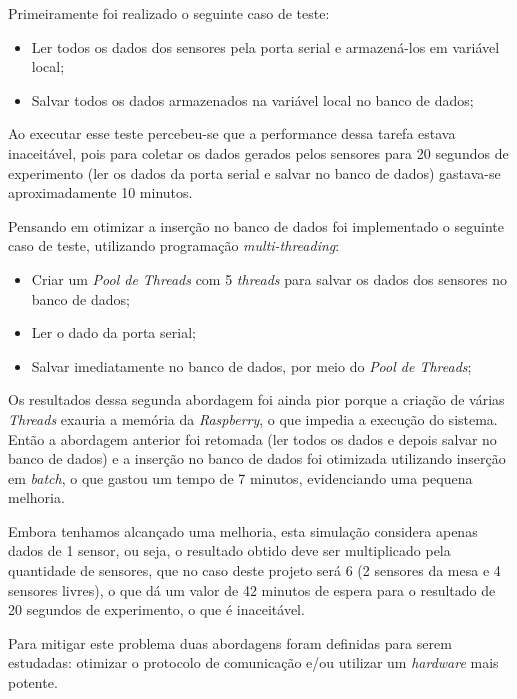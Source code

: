 Primeiramente foi realizado o seguinte caso de teste: 
\begin{itemize}
 \item Ler todos os dados dos sensores pela porta serial e armazená-los em variável local;
 \item Salvar todos os dados armazenados na variável local no banco de dados;
\end{itemize}

Ao executar esse teste percebeu-se que a performance dessa tarefa estava inaceitável, pois para coletar os dados gerados pelos sensores
para 20 segundos de experimento (ler os dados da porta serial e salvar no banco de dados) gastava-se aproximadamente 10 minutos. 

Pensando em otimizar a inserção no banco de dados foi implementado o seguinte caso de teste, utilizando programação \textit{multi-threading}:
\begin{itemize}
 \item Criar um \textit{Pool de Threads} com 5 \textit{threads} para salvar os dados dos sensores no banco de dados;
 \item Ler o dado da porta serial;
 \item Salvar imediatamente no banco de dados, por meio do \textit{Pool de Threads};
\end{itemize}

Os resultados dessa segunda abordagem foi ainda pior porque a criação de várias \textit{Threads} exauria a memória da \textit{Raspberry},
o que impedia a execução do sistema. Então a abordagem anterior foi retomada (ler todos os dados e depois salvar no banco de dados) e a inserção
no banco de dados foi otimizada utilizando inserção em \textit{batch}, o que gastou um tempo de 7 minutos, evidenciando uma pequena melhoria.

Embora tenhamos alcançado uma melhoria, esta simulação considera apenas dados de 1 sensor, ou seja, o resultado obtido deve ser multiplicado pela
quantidade de sensores, que no caso deste projeto será 6 (2 sensores da mesa e 4 sensores livres), o que dá um valor de 42 minutos de espera para
o resultado de 20 segundos de experimento, o que é inaceitável.

Para mitigar este problema duas abordagens foram definidas para serem estudadas: otimizar o protocolo de comunicação e/ou utilizar um
\textit{hardware} mais potente.